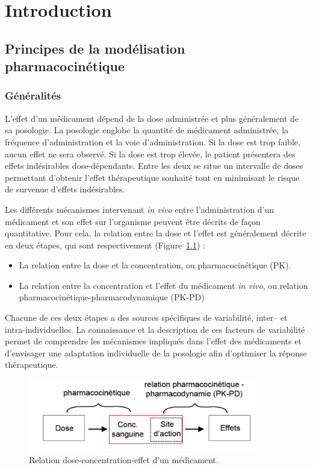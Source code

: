 \chapter{Introduction}
\section{Principes de la modélisation pharmacocinétique}
\subsection{Généralités}
L'effet d'un médicament dépend de la dose administrée et plus généralement de sa posologie. La posologie englobe la quantité de médicament administrée, la fréquence d'administration et la voie d'administration. Si la dose est trop faible, aucun effet ne sera observé. Si la dose est trop élevée, le patient présentera des effets indésirables dose-dépendants. Entre les deux se situe un intervalle de doses permettant d'obtenir l'effet thérapeutique souhaité tout en minimisant le risque de survenue d'effets indésirables.

Les différents mécanismes intervenant \textit{in vivo} entre l'administration d'un médicament et son effet sur l'organisme peuvent être décrits de façon quantitative. Pour cela, la relation entre la dose et l'effet est généralement décrite en deux étapes, qui sont respectivement (Figure~\ref{fig:1}) :
\begin{itemize}
\item La relation entre la dose et la concentration, ou pharmacocinétique (PK).
\item La relation entre la concentration et l'effet du médicament \textit{in vivo}, ou relation pharmacocinétique-pharmacodynamique (PK-PD)
\end{itemize}

Chacune de ces deux étapes a des sources spécifiques de variabilité, inter-- et intra-individuelles. La connaissance et la description de ces facteurs de variabilité permet de comprendre les mécanismes impliqués dans l'effet des médicaments et d'envisager une adaptation individuelle de la posologie afin d'optimiser la réponse thérapeutique.

\begin{figure}[htbp]
	\centering
		\includegraphics[width=10cm]{figures/raster/FIG_1}
	\caption{Relation dose-concentration-effet d'un médicament.}
	\label{fig:1}
\end{figure}

